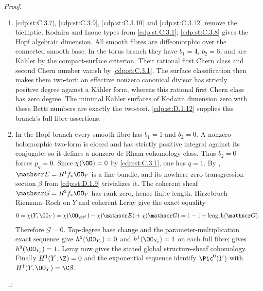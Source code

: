 \begin{proof}

\begin{enumerate}[leftmargin=*]
\item \ref{cdp:st:C.3.7}, \ref{cdp:st:C.3.9}, \ref{cdp:st:C.3.10} and \ref{cdp:st:C.3.12} remove the bielliptic,
Kodaira and Inoue types from \ref{cdp:st:C.3.1}; \ref{cdp:st:C.3.8} gives the Hopf algebraic
dimension. All smooth fibres are diffeomorphic over the
connected smooth base. In the torus branch they have
$b_1=4$, $b_2=6$, and are K\"ahler by the compact-surface
criterion. Their rational first Chern class and second
Chern number vanish by \ref{cdp:st:C.3.1}. The surface classification
then makes them two-tori: an effective nonzero canonical
divisor has strictly positive degree against a K\"ahler
form, whereas this rational first Chern class has zero
degree. The minimal K\"ahler surfaces of Kodaira dimension
zero with these Betti numbers are exactly the two-tori.
\ref{cdp:st:D.1.12} supplies this branch's full-fibre assertions.

\item In the Hopf branch every smooth fibre has
$b_1=1$ and $b_2=0$. A nonzero holomorphic two-form
is closed and has strictly positive integral against
its conjugate, so it defines a nonzero de Rham
cohomology class. Thus $b_2=0$ forces $p_g=0$.
Since $\chi(\OO)=0$ by \ref{cdp:st:C.3.1}, one has $q=1$.
By \cite[Theorem~2.2, pp.~4--5]{Viaclovsky2026Combs}, $\mathscr E=R^1f_*\OO_Y$ is a line bundle,
and its nowhere-zero transgression section $\beta$
from \ref{cdp:st:D.1.9} trivializes it. The coherent sheaf
$\mathscr G=R^2f_*\OO_Y$ has rank zero, hence finite
length. Hirzebruch--Riemann--Roch on $Y$ and coherent
Leray give the exact equality
\[
 0=\chi(Y,\OO_Y)
   =\chi(\OO_{\PP^1})-\chi(\mathscr E)+\chi(\mathscr G)
   =1-1+\operatorname{length}(\mathscr G).
\]
Therefore $\mathscr G=0$. Top-degree base change and
the parameter-multiplication exact sequence give
$h^2(\OO_{Y_c})=0$ and $h^1(\OO_{Y_c})=1$ on each
full fibre; \cite[Theorem~2.2, pp.~4--5]{Viaclovsky2026Combs} gives $h^0(\OO_{Y_c})=1$.
Leray now gives the stated global structure-sheaf
cohomology. Finally $H^1(Y;\Z)=0$ and the exponential
sequence identify $\Pic^0(Y)$ with
$H^1(Y,\OO_Y)=\C\beta$.

\end{enumerate}
\end{proof}